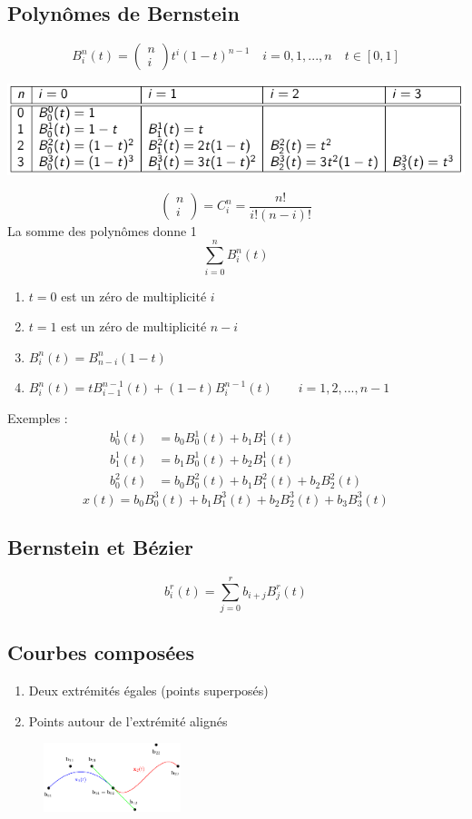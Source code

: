 \documentclass[resume]{subfiles}
\begin{document}
	\subsection{Polynômes de Bernstein}
	$$\boxed{B_i^n(t)=\begin{pmatrix}
	n\\i
	\end{pmatrix}t^{i}(1-t)^{n-1}\quad i=0,1,...,n\quad t\in[0,1]}$$
	\begin{center}
	\includegraphics[width=0.8\columnwidth]{img_21.pdf}
	\end{center}
	$$\begin{pmatrix}
	n\\i
	\end{pmatrix}=C_{i}^{n}=\frac{n!}{i!(n-i)!}$$
	La somme des polynômes donne 1
	$$\sum_{i=0}^{n}B_{i}^{n}(t)$$
	\begin{enumerate}
	\item $t=0$ est un zéro de multiplicité $i$
	\item $t=1$ est un zéro de multiplicité $n-i$
	\item $B_{i}^{n}(t)=B_{n-i}^{n}(1-t)$
	\item $B_{i}^{n}(t)=tB_{i-1}^{n-1}(t)+(1-t)B_{i}^{n-1}(t)\qquad i=1,2,...,n-1$
	\end{enumerate}
	Exemples :
	\begin{align*}
	b_0^1(t)&=b_0B_{0}^{1}(t)+b_1B_1^1(t)\\
	b_1^1(t)&=b_1B_0^1(t)+b_2B_1^1(t)\\
	b_0^2(t)&=b_0B_0^2(t)+b_1B_1^2(t)+b_2B_2^2(t)
	\end{align*}
	$$\boxed{x(t)=b_0B_0^3(t)+b_1B_1^3(t)+b_2B_2^3(t)+b_3B_3^3(t)}$$
	\subsection{Bernstein et Bézier}
	$$b_i^r(t)=\sum_{j=0}^{r}b_{i+j}B_j^r(t)$$
	\subsection{Courbes composées}
\begin{enumerate}
\item Deux extrémités égales (points superposés)
\item Points autour de l'extrémité alignés
\end{enumerate}
\begin{figure}[H]
\centering
\includegraphics[width=4cm]{img_0.pdf}
\end{figure}



    
\end{document}
